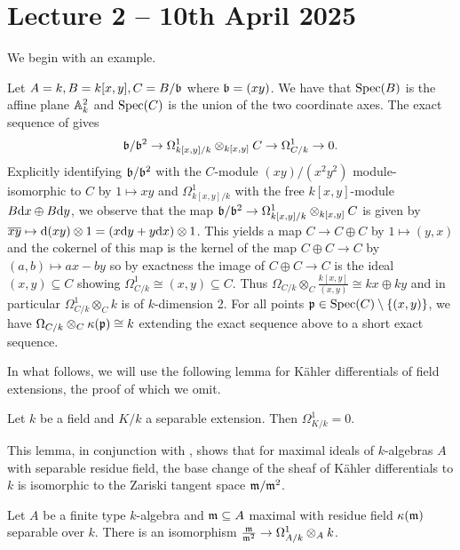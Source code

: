 \section{Lecture 2 -- 10th April 2025}\label{sec: lecture 2}
We begin with an example. 
\begin{example}
    Let $A=k, B=k[x,y], C=B/\mathfrak{b}$ where $\mathfrak{b}=(xy)$. We have that $\operatorname{Spec}(B)$ is the affine plane $\mathbb{A}^{2}_{k}$ and $\operatorname{Spec}(C)$ is the union of the two coordinate axes. The exact sequence of  gives 
    $$\mathfrak{b}/\mathfrak{b}^{2}\to\Omega_{k[x,y]/k}^{1}\otimes_{k[x,y]}C\to\Omega_{C/k}^{1}\to0.$$
    Explicitly identifying $\mathfrak{b}/\mathfrak{b}^{2}$ with the $C$-module $(xy)/(x^{2}y^{2})$ module-isomorphic to $C$ by $1\mapsto xy$ and $\Omega^{1}_{k[x,y]/k}$ with the free $k[x,y]$-module $B\mathrm{d} x\oplus B\mathrm{d} y$, we observe that the map $\mathfrak{b}/\mathfrak{b}^{2}\to\Omega^{1}_{k[x,y]/k}\otimes_{k[x,y]} C$ is given by $\overline{xy}\mapsto\mathrm{d}(xy)\otimes 1=(x\mathrm{d} y+y\mathrm{d} x)\otimes 1$. This yields a map $C\to C\oplus C$ by $1\mapsto (y,x)$ and the cokernel of this map is the kernel of the map $C\oplus C\to C$ by $(a,b)\mapsto ax-by$ so by exactness the image of $C\oplus C\to C$ is the ideal $(x,y)\subseteq C$ showing $\Omega^{1}_{C/k}\cong (x,y)\subseteq C$. Thus $\Omega_{C/k}\otimes_{C}\frac{k[x,y]}{(x,y)}\cong kx\oplus ky$ and in particular $\Omega_{C/k}^{1}\otimes_{C}k$ is of $k$-dimension 2. For all points $\mathfrak{p}\in\operatorname{Spec}(C)\setminus\{(x,y)\}$, we have $\Omega_{C/k}\otimes_{C}\kappa(\mathfrak{p})\cong k$ extending the exact sequence above to a short exact sequence. 
\end{example}
In what follows, we will use the following lemma for K\"{a}hler differentials of field extensions, the proof of which we omit. 
\begin{lemma}\label{lem: differentials of separable extension are zero}
    Let $k$ be a field and $K/k$ a separable extension. Then $\Omega_{K/k}^{1}=0$. 
\end{lemma}
This lemma, in conjunction with , shows that for maximal ideals of $k$-algebras $A$ with separable residue field, the base change of the sheaf of K\"{a}hler differentials to $k$ is isomorphic to the Zariski tangent space $\mathfrak{m}/\mathfrak{m}^{2}$. 
\begin{proposition}\label{prop: isomorphism to Zariski tangent space}
    Let $A$ be a finite type $k$-algebra and $\mathfrak{m}\subseteq A$ maximal with residue field $\kappa(\mathfrak{m})$ separable over $k$. There is an isomorphism $\frac{\mathfrak{m}}{\mathfrak{m}^{2}}\to\Omega_{A/k}^{1}\otimes_{A}k$. 
\end{proposition}
